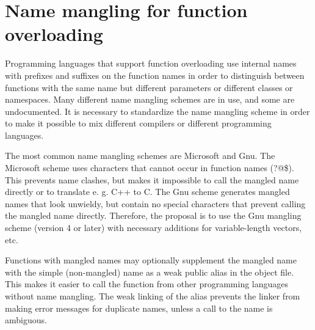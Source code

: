 \documentclass[forwardcom.tex]{subfiles}
\begin{document}
\section{Name mangling for function overloading} \label{nameMangling}
Programming languages that support function overloading use internal names with prefixes and suffixes on the function names in order to distinguish between functions with the same name but different parameters or different classes or namespaces. Many different name mangling schemes are in use, and some are undocumented. It is necessary to standardize the name mangling scheme in order to make it possible to mix different compilers or different programming languages.
\vspace{2mm}

The most common name mangling schemes are Microsoft and Gnu. The Microsoft scheme uses characters that cannot occur in function names (?@\$). This prevents name clashes, but makes it impossible to call the mangled name directly or to translate e. g. C++ to C. The Gnu scheme generates mangled names that look unwieldy, but contain no special characters that prevent calling the mangled name directly. Therefore, the proposal is to use the Gnu mangling scheme (version 4 or later) with necessary additions for variable-length vectors, etc. 
\vspace{2mm}

Functions with mangled names may optionally supplement the mangled name with the simple (non-mangled) name as a weak public alias in the object file. This makes it easier to call the function from other programming languages without name mangling. The weak linking of the alias prevents the linker from making error messages for duplicate names, unless a call to the name is ambiguous. 

\end{document}
